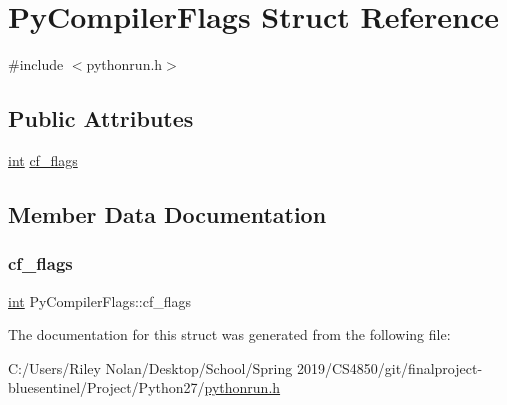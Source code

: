 \hypertarget{struct_py_compiler_flags}{}\section{Py\+Compiler\+Flags Struct Reference}
\label{struct_py_compiler_flags}


{\ttfamily \#include $<$pythonrun.\+h$>$}

\subsection*{Public Attributes}
\begin{DoxyCompactItemize}
\item 
\mbox{\hyperlink{warnings_8h_a74f207b5aa4ba51c3a2ad59b219a423b}{int}} \mbox{\hyperlink{struct_py_compiler_flags_a5b23323cb0cc7f1c460991ccea5c0a3d}{cf\+\_\+flags}}
\end{DoxyCompactItemize}


\subsection{Member Data Documentation}
\mbox{\label{struct_py_compiler_flags_a5b23323cb0cc7f1c460991ccea5c0a3d}} 
\subsubsection{\texorpdfstring{cf\_flags}{cf\_flags}}
{\footnotesize\ttfamily \mbox{\hyperlink{warnings_8h_a74f207b5aa4ba51c3a2ad59b219a423b}{int}} Py\+Compiler\+Flags\+::cf\+\_\+flags}



The documentation for this struct was generated from the following file\+:\begin{DoxyCompactItemize}
\item 
C\+:/\+Users/\+Riley Nolan/\+Desktop/\+School/\+Spring 2019/\+C\+S4850/git/finalproject-\/bluesentinel/\+Project/\+Python27/\mbox{\hyperlink{pythonrun_8h}{pythonrun.\+h}}\end{DoxyCompactItemize}
